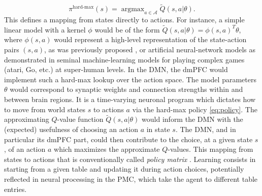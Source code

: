 \documentclass[10pt,letterpaper]{article}
\DeclareMathOperator{\argmax}{argmax}
\begin{document}
\begin{equation}
  \pi^{\text{hard-max}}(s) = \argmax_{a \in \mathcal A}\tilde{Q}(s, a|\theta).
  \label{eq:policy}
\end{equation}
This defines a mapping from states directly to actions.
For instance, a simple linear model with a kernel $\phi$ would be of the
form $\tilde{Q}(s, a|\theta) = \phi(s,a)^T\theta$, where
$\phi(s,a)$ would represent a high-level representation of the state-action pairs
$(s,a)$, as was previously proposed \citep{songNIPS2016},
or artificial neural-network models as demonstrated in 
seminal machine-learning models
\citep{mnih2015,silver2016mastering} for playing complex games (atari, Go, etc.) at super-human levels.
In the DMN, the dmPFC would implement such a hard-max lookup
over the action space.
The model
parameters $\theta$ would correspond to synaptic weights and connection strengths within and between
brain regions. It is a time-varying neuronal program which dictates how to move from world states $s$ to actions $a$ via the hard-max policy \eqref{eq:policy}.
The approximating $Q$-value function $\tilde{Q}(s, a|\theta)$ would inform the DMN with the (expected) usefulness of choosing an action $a$ in state $s$.
The DMN, and in particular its dmPFC part, could then contribute to the choice, at a given state $s$, of an action $a$ which maximizes the approximate
$Q$-values.
This mapping from states to actions that is conventionally called
\textit{policy matrix} \citep{mnih2015,silver2016mastering}.
Learning consists in starting from a given table and
updating it during action choices, potentially reflected in neural processing in the PMC,
which take the agent to different table entries.



\end{document}
